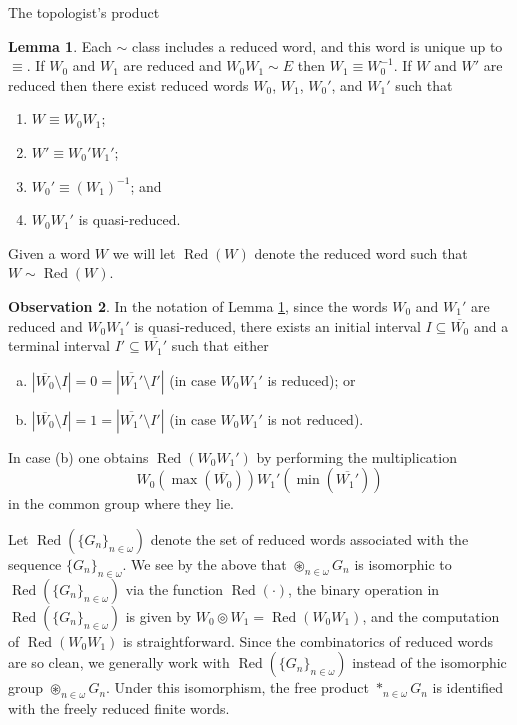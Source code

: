 \documentclass{amsart}
\theoremstyle{definition}\newtheorem{theorem}{Theorem}
\theoremstyle{definition}\newtheorem*{A}{Main Theorem}
\theoremstyle{definition}\newtheorem*{B}{Theorem \ref{elementaryequiv}}
\theoremstyle{definition}\newtheorem*{C}{Theorem \ref{continuous}}
\theoremstyle{definition}\newtheorem*{D}{Theorem \ref{bigisomorphism2}}
\theoremstyle{definition}\newtheorem{bigtheorem}{Main Theorem}
\numberwithin{theorem}{section}
\theoremstyle{definition}\newtheorem{corollary}[theorem]{Corollary}
\theoremstyle{definition}\newtheorem{proposition}[theorem]{Proposition}
\theoremstyle{definition}\newtheorem{definition}[theorem]{Definition}
\theoremstyle{definition}\newtheorem{question}[theorem]{Question}
\theoremstyle{definition}\newtheorem{example}[theorem]{Example}
\theoremstyle{definition}\newtheorem{remark}[theorem]{Remark}
\theoremstyle{definition}\newtheorem{note}[theorem]{Note}
\theoremstyle{definition}\newtheorem{lemma}[theorem]{Lemma}
\theoremstyle{definition}\newtheorem{fact}[theorem]{Fact}
\theoremstyle{definition}\newtheorem{define}[theorem]{Definition}
\theoremstyle{definition}\newtheorem{claim}[theorem]{Claim}
\theoremstyle{definition}\newtheorem{obs}[theorem]{Observation}
\theoremstyle{definition}\newtheorem{definitions}[theorem]{Definitions}
\newcommand{\Red}{\operatorname{Red}}
\DeclareMathOperator{\topprod}{\circledast}
\begin{document}
\begin{section}{The topologist's product}
\begin{lemma}\label{Eda}  Each $\sim$ class includes a reduced word, and this word is unique up to $\equiv$.  If $W_0$ and $W_1$ are reduced and $W_0W_1 \sim E$ then $W_1 \equiv W_0^{-1}$.  If $W$ and $W'$ are reduced then there exist reduced words $W_0$, $W_1$, $W_0'$, and $W_1'$ such that

\begin{enumerate}
\item $W \equiv W_0W_1$;

\item $W' \equiv W_0'W_1'$;

\item $W_0' \equiv (W_1)^{-1}$; and

\item $W_0W_1'$ is quasi-reduced.
\end{enumerate}

\noindent Given a word $W$ we will let $\Red(W)$ denote the reduced word such that $W \sim \Red(W)$.
\end{lemma}

\begin{obs}\label{howtomultuply}  In the notation of Lemma \ref{Eda}, since the words $W_0$ and $W_1'$ are reduced and $W_0W_1'$ is quasi-reduced, there exists an initial interval $I \subseteq \overline{W_0}$ and a terminal interval $I' \subseteq \overline{W_1'}$ such that either

\begin{enumerate}[(a)]

\item $|\overline{W_0} \setminus I| = 0 = |\overline{W_1'} \setminus I'|$ (in case $W_0W_1'$ is reduced); or

\item $|\overline{W_0} \setminus I| = 1 = |\overline{W_1'} \setminus I'|$ (in case $W_0W_1'$ is not reduced).
\end{enumerate}

\noindent In case (b) one obtains $\Red(W_0W_1')$ by performing the multiplication $$W_0(\max(\overline{W_0}))W_1'(\min(\overline{W_1'}))$$ in the common group where they lie.
\end{obs}

Let $\Red(\{G_n\}_{n \in \omega})$ denote the set of reduced words associated with the sequence $\{G_n\}_{n \in \omega}$.  We see by the above that $\topprod_{n \in \omega} G_n$ is isomorphic to $\Red(\{G_n\}_{n \in \omega})$ via the function $\Red(\cdot)$, the binary operation in $\Red(\{G_n\}_{n \in \omega})$ is given by $W_0 \circledcirc W_1 = \Red(W_0W_1)$, and the computation of $\Red(W_0W_1)$ is straightforward.  Since the combinatorics of  reduced words are so clean, we generally work with $\Red(\{G_n\}_{n \in \omega})$ instead of the isomorphic group $\topprod_{n \in \omega} G_n$.  Under this isomorphism, the free product $*_{n \in \omega}G_n$ is identified with the freely reduced finite words.


\end{section}
\end{document}
